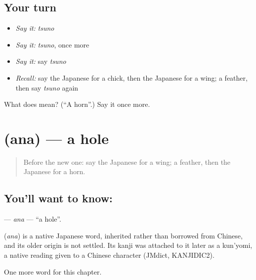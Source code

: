 \subsection*{Your turn}
\begin{itemize}
\raggedright
  \item \emph{Say it:} \emph{tsuno}
  \item \emph{Say it:} \emph{tsuno}, once more
  \item \emph{Say it:} say \emph{tsuno}
  \item \emph{Recall:} say the Japanese for a chick, then the Japanese for a wing; a feather, then say \emph{tsuno} again
\end{itemize}

\begin{tcolorbox}[breakable,colback=teal!4,colframe=teal!35!black,title={Before you move on}]
What does  mean? (\textquotedblleft{}A horn\textquotedblright{}.) Say it once more.
\end{tcolorbox}
\section[\texorpdfstring{\ja{あな} (ana)}{あな (ana)}]{ (ana) — a hole}

\label{lesson:JA-C71-ana}



\begin{quote}
Before the new one: say the Japanese for a wing; a feather, then the Japanese for a horn.
\end{quote}

\subsection*{You'll want to know: }
\textbf{} — \emph{ana} — \textquotedblleft{}a hole\textquotedblright{}.

\begin{cousinweb}
\textbf{} (\emph{ana}) is a native Japanese word, inherited rather than borrowed from Chinese, and its older origin is not settled. Its kanji was attached to it later as a kun'yomi, a native reading given to a Chinese character (JMdict, KANJIDIC2).
\end{cousinweb}

\begin{grammarlens}[title={What you've built}]
One more word for this chapter.
\end{grammarlens}

